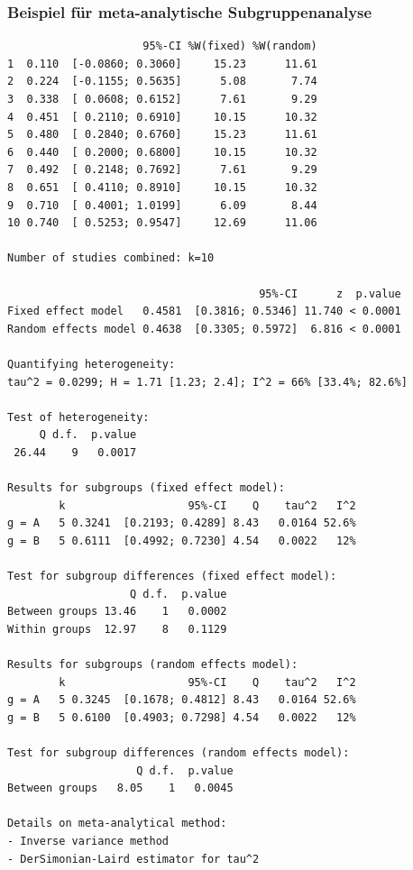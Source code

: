 \begin{frame}[fragile, plain, shrink=10]
  \frametitle{Beispiel für meta-analytische Subgruppenanalyse}\label{slide:anova-example}
\begin{tiny}
\begin{knitrout}
\color{fgcolor}\begin{kframe}
\begin{verbatim}
                     95%-CI %W(fixed) %W(random)
1  0.110  [-0.0860; 0.3060]     15.23      11.61
2  0.224  [-0.1155; 0.5635]      5.08       7.74
3  0.338  [ 0.0608; 0.6152]      7.61       9.29
4  0.451  [ 0.2110; 0.6910]     10.15      10.32
5  0.480  [ 0.2840; 0.6760]     15.23      11.61
6  0.440  [ 0.2000; 0.6800]     10.15      10.32
7  0.492  [ 0.2148; 0.7692]      7.61       9.29
8  0.651  [ 0.4110; 0.8910]     10.15      10.32
9  0.710  [ 0.4001; 1.0199]      6.09       8.44
10 0.740  [ 0.5253; 0.9547]     12.69      11.06

Number of studies combined: k=10

                                       95%-CI      z  p.value
Fixed effect model   0.4581  [0.3816; 0.5346] 11.740 < 0.0001
Random effects model 0.4638  [0.3305; 0.5972]  6.816 < 0.0001

Quantifying heterogeneity:
tau^2 = 0.0299; H = 1.71 [1.23; 2.4]; I^2 = 66% [33.4%; 82.6%]

Test of heterogeneity:
     Q d.f.  p.value
 26.44    9   0.0017

Results for subgroups (fixed effect model):
        k                   95%-CI    Q    tau^2   I^2
g = A   5 0.3241  [0.2193; 0.4289] 8.43   0.0164 52.6%
g = B   5 0.6111  [0.4992; 0.7230] 4.54   0.0022   12%

Test for subgroup differences (fixed effect model):
                   Q d.f.  p.value
Between groups 13.46    1   0.0002
Within groups  12.97    8   0.1129

Results for subgroups (random effects model):
        k                   95%-CI    Q    tau^2   I^2
g = A   5 0.3245  [0.1678; 0.4812] 8.43   0.0164 52.6%
g = B   5 0.6100  [0.4903; 0.7298] 4.54   0.0022   12%

Test for subgroup differences (random effects model):
                    Q d.f.  p.value
Between groups   8.05    1   0.0045

Details on meta-analytical method:
- Inverse variance method
- DerSimonian-Laird estimator for tau^2
\end{verbatim}
\end{kframe}
\end{knitrout}

\end{tiny}
\end{frame}




